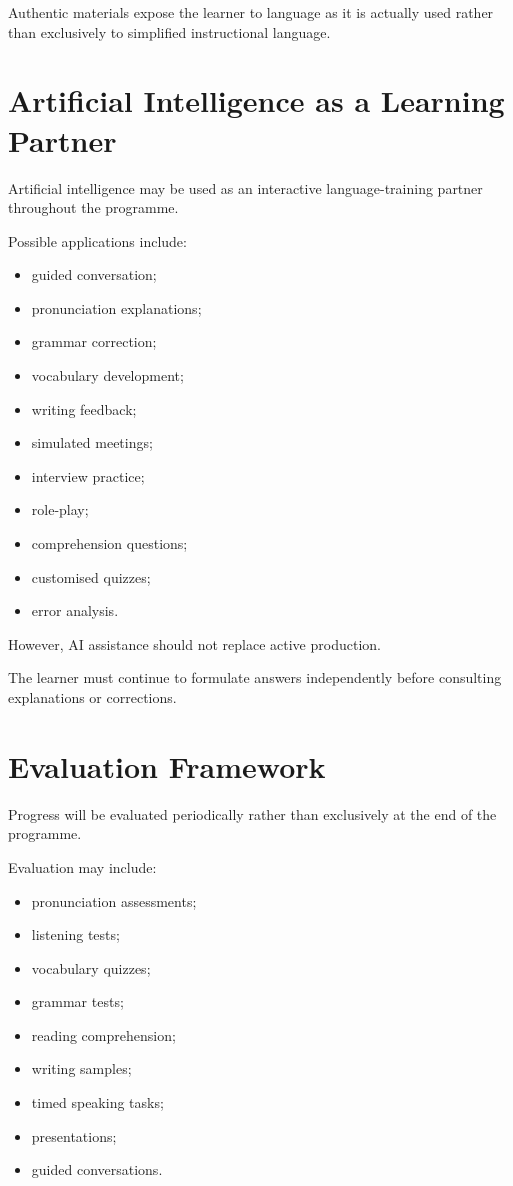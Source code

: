 Authentic materials expose the learner to language as it is actually used rather than exclusively to simplified instructional language.

\section*{Artificial Intelligence as a Learning Partner}

Artificial intelligence may be used as an interactive language-training partner throughout the programme.

Possible applications include:

\begin{itemize}
    \item guided conversation;
    \item pronunciation explanations;
    \item grammar correction;
    \item vocabulary development;
    \item writing feedback;
    \item simulated meetings;
    \item interview practice;
    \item role-play;
    \item comprehension questions;
    \item customised quizzes;
    \item error analysis.
\end{itemize}

However, AI assistance should not replace active production.

The learner must continue to formulate answers independently before consulting explanations or corrections.

\section*{Evaluation Framework}

Progress will be evaluated periodically rather than exclusively at the end of the programme.

Evaluation may include:

\begin{itemize}
    \item pronunciation assessments;
    \item listening tests;
    \item vocabulary quizzes;
    \item grammar tests;
    \item reading comprehension;
    \item writing samples;
    \item timed speaking tasks;
    \item presentations;
    \item guided conversations.
\end{itemize}

